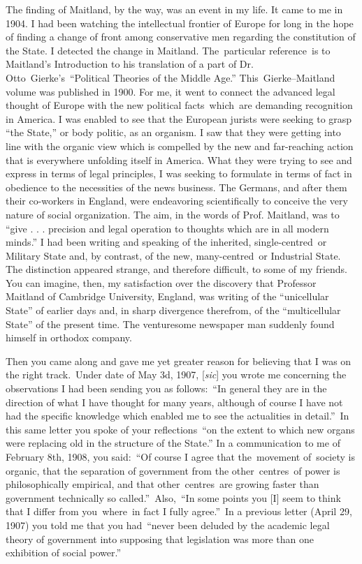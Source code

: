 \documentclass[openany,nobib]{tufte-book}
\begin{document}
The finding of Maitland, by the way, was an event in my life. It came to
me in 1904. I had been watching the intellectual frontier of Europe for
long in the hope of finding a change of front among conservative men
regarding the constitution of the State. I detected the change in
Maitland. The~particular reference~is to Maitland's Introduction to his
translation of a part of Dr. Otto~Gierke's~``Political Theories of the
Middle Age.'' This~Gierke--Maitland volume was published in 1900. For
me, it went to connect the advanced legal thought of Europe with the new
political facts~which~are demanding recognition in America. I was
enabled to see that the European jurists were seeking to grasp ``the
State,'' or body politic, as an organism. I saw that they were getting
into line with the organic view which is compelled by the new and
far-reaching action that is everywhere unfolding itself in America. What
they were trying to see and express in terms of legal principles, I was
seeking to formulate in terms of fact in obedience to the necessities of
the news business. The Germans, and after them their co-workers in
England, were endeavoring scientifically to conceive the very nature of
social organization. The aim, in the words of Prof. Maitland, was to
``give . . . precision and legal operation to thoughts which are in all
modern minds.'' I had been writing and speaking of the inherited,
single-centred~or Military State and, by contrast, of the new,
many-centred~or Industrial State. The distinction appeared strange, and
therefore difficult, to some of my friends. You can imagine, then, my
satisfaction over the discovery that Professor Maitland of Cambridge
University, England, was writing of the ``unicellular State'' of earlier
days and, in sharp divergence therefrom, of the ``multicellular State''
of the present time. The venturesome newspaper man suddenly found
himself in orthodox company.~

Then you came along and gave me yet greater reason for believing that I
was on the right track.~Under date of May 3d, 1907, {[}\emph{sic}{]} you
wrote me concerning the observations I had been sending you as
follows:~``In general they are in the direction of what I have thought
for many years, although of course I have not had the specific knowledge
which enabled me to see the actualities in detail.''~In this same letter
you spoke of your reflections~``on the extent to which new organs were
replacing old in the structure of the State.'' In a communication to me
of February 8th, 1908, you said:~``Of course I agree that the~movement
of~society is organic, that the separation of government from the
other~centres~of power is philosophically empirical, and that
other~centres~are growing faster than government technically so
called.''~Also,~``In some points you {[}I{]} seem to think that I differ
from you~where~in fact I fully agree.''~In a previous letter (April 29,
1907) you told me that you had~``never been deluded by the academic
legal theory of government into supposing that legislation was more than
one exhibition of social power.''
\end{document}
